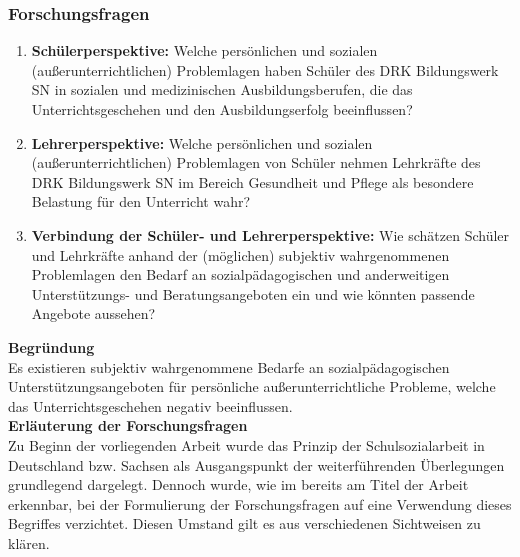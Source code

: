 \subsubsection{Forschungsfragen}
\label{sec:Forschungsfragen}

\begin{enumerate}
	\item \textbf{Schülerperspektive:}
	Welche persönlichen und sozialen (außerunterrichtlichen) Problemlagen haben Schüler des DRK Bildungswerk SN in sozialen und medizinischen Ausbildungsberufen, die das Unterrichtsgeschehen und den Ausbildungserfolg beeinflussen?
	\item \textbf{Lehrerperspektive:}
	Welche persönlichen und sozialen (außerunterrichtlichen) Problemlagen von Schüler nehmen Lehrkräfte des DRK Bildungswerk SN im Bereich Gesundheit und Pflege als besondere Belastung für den Unterricht wahr?
	\item \textbf{Verbindung der Schüler- und Lehrerperspektive:}
	Wie schätzen Schüler und Lehrkräfte anhand der (möglichen) subjektiv wahrgenommenen Problemlagen den Bedarf an sozialpädagogischen und anderweitigen Unterstützungs- und Beratungsangeboten ein und wie könnten passende Angebote aussehen?
\end{enumerate}

\noindent
\textbf{Begründung}\\

\noindent
Es existieren subjektiv wahrgenommene Bedarfe an sozialpädagogischen Unterstützungsangeboten für persönliche außerunterrichtliche Probleme, welche das Unterrichtsgeschehen negativ beeinflussen.\\

\noindent
\textbf{Erläuterung der Forschungsfragen}\\

\noindent
Zu Beginn der vorliegenden Arbeit wurde das Prinzip der Schulsozialarbeit in Deutschland bzw. Sachsen als Ausgangspunkt der weiterführenden Überlegungen grundlegend dargelegt. Dennoch wurde, wie im bereits am Titel der Arbeit erkennbar, bei der Formulierung der Forschungsfragen auf eine Verwendung dieses Begriffes verzichtet. Diesen Umstand gilt es aus verschiedenen Sichtweisen zu klären.
 
